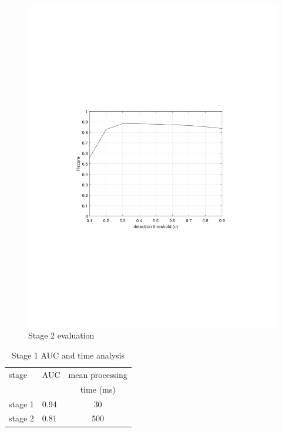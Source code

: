 \begin{figure}
    \centering
    \includegraphics[width=\linewidth,trim={300 670 300 690},clip]{images/f1-analysis-s2.jpg}
    \caption{Stage 2 evaluation}
    \label{fig:f1-analysis-s2}
\end{figure}



\begin{table}
\centering
\caption{Stage 1 AUC and time analysis} \vspace{5pt}
\label{table:auc-time-analysis-s1}
\begin{tabular}{|l|l|c|}
\hline
stage   	& AUC     & mean processing \\
            &         &  time (ms)  \\ \hline \hline
stage 1     & 0.94    & 30    \\ \hline
stage 2     & 0.81    & 500  \\ \hline
\end{tabular}
\end{table}

